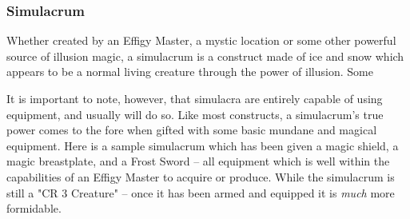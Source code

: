 %
\subsubsection{Simulacrum}
Whether created by an Effigy Master, a mystic location or some other powerful source of illusion magic, a simulacrum is a construct made of ice and snow which appears to be a normal living creature through the power of illusion. Some

\noindent{}

It is important to note, however, that simulacra are entirely capable of using equipment, and usually will do so. Like most constructs, a simulacrum's true power comes to the fore when gifted with some basic mundane and magical equipment. Here is a sample simulacrum which has been given a magic shield, a magic breastplate, and a Frost Sword -- all equipment which is well within the capabilities of an Effigy Master to acquire or produce. While the simulacrum is still a "CR 3 Creature" -- once it has been armed and equipped it is \textit{much} more formidable.

